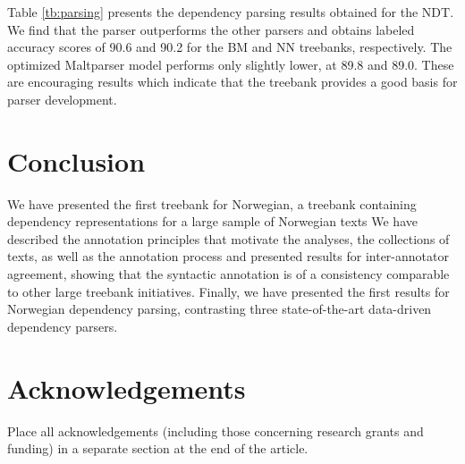 \documentclass[10pt,a4paper]{article}
\begin{document}

Table \ref{tb:parsing} presents the dependency parsing results
obtained for the NDT. We find that the  parser
outperforms the other parsers and obtains labeled accuracy scores of
90.6 and 90.2 for the BM and NN treebanks, respectively.  The
optimized Maltparser model performs only slightly lower, at 89.8 and
89.0.  These are encouraging results which indicate that the treebank
provides a good basis for parser development.

\section{Conclusion}
We have presented the first treebank for Norwegian, a treebank
containing dependency representations for a large sample of Norwegian
texts
We have described the
annotation principles that motivate the analyses, the collections of
texts, as well as the annotation process and presented results for
inter-annotator agreement, showing that the syntactic annotation is of
a consistency comparable to other large treebank initiatives. Finally,
we have presented the first results for Norwegian dependency parsing,
contrasting three state-of-the-art data-driven dependency parsers.

\section{Acknowledgements}

Place all acknowledgements (including those concerning research grants and funding) in a separate section at the end of the article.





\end{document}
